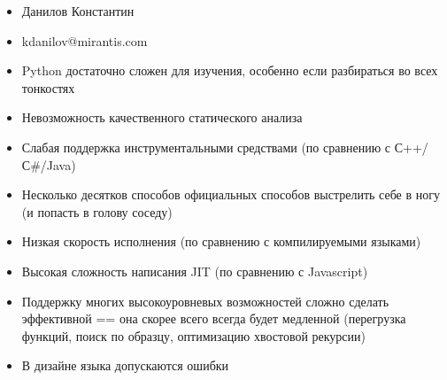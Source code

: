 \documentclass{article}
\begin{document}
\LARGE

\begin{itemize}
    \item Данилов Константин
    \item kdanilov@mirantis.com
\end{itemize}
\newpage
\begin{itemize}
    \item Python достаточно сложен для изучения, особенно если разбираться во всех тонкостях
    \item Невозможность качественного статического анализа
    \item Слабая поддержка инструментальными средствами (по сравнению с С++/С\#/Java)
    \item Несколько десятков способов официальных способов выстрелить себе в ногу (и попасть в голову соседу)
    \item Низкая скорость исполнения (по сравнению с компилируемыми языками)
    \item Высокая сложность написания JIT (по сравнению с Javascript)
    \item Поддержку многих высокоуровневых возможностей сложно сделать эффективной 
          == она скорее всего всегда будет медленной
            (перегрузка функций, поиск по образцу, оптимизацию хвостовой рекурсии)
    \item В дизайне языка допускаются ошибки
\end{itemize}
\newpage
\end{document}
